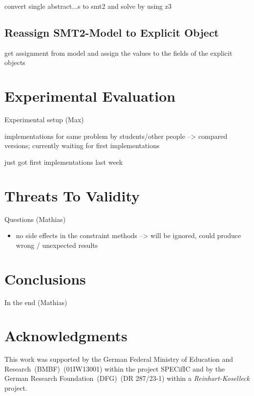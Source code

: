 \documentclass[conference]{IEEEtran}
\begin{document}
\danger convert single abstract...s to smt2 and solve by using z3

\subsection{Reassign SMT2-Model to Explicit Object}
\label{sec:impl_reassign_model}

\danger get assignment from model and assign the values to the fields of the
explicit objects

\section{Experimental Evaluation}
\label{sec:exper-eval}

\danger Experimental setup (Max)

\danger implementations for same problem by students/other people --> compared
versions; currently waiting for first implementations

\danger just got first implementations last week

\section{Threats To Validity}
\label{sec:threats-validity}

\danger Questions (Mathias)

\begin{itemize}
  \item no side effects in the constraint methods --> will be ignored, could
    produce wrong / unexpected results
\end{itemize}

\section{Conclusions}
\label{sec:conclusions}

\danger In the end (Mathias)

\section*{Acknowledgments}
\label{sec:acknowledgments}

This work was supported by the German Federal Ministry of Education and
Research~(BMBF)~(01IW13001) within the project SPECifIC and by the German
Research Foundation~(DFG)~(DR 287/23-1) within a \emph{Reinhart-Koselleck}
project.




\end{document}
